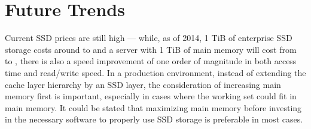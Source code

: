 \documentclass{acm_proc_article-sp}
\begin{document}
\section{Future Trends}
Current SSD prices are still high --- while, as of 2014, 1 TiB of enterprise SSD storage costs around  to  and a server with 1 TiB of main memory will cost from  to , there is also a speed improvement of one order of magnitude in both access time and read/write speed. In a production environment, instead of extending the cache layer hierarchy by an SSD layer, the consideration of increasing main memory first is important, especially in cases where the working set could fit in main memory. It could be stated that maximizing main memory before investing in the necessary software to properly use SSD storage is preferable in most cases.

%

%
%

\balancecolumns
\end{document}
